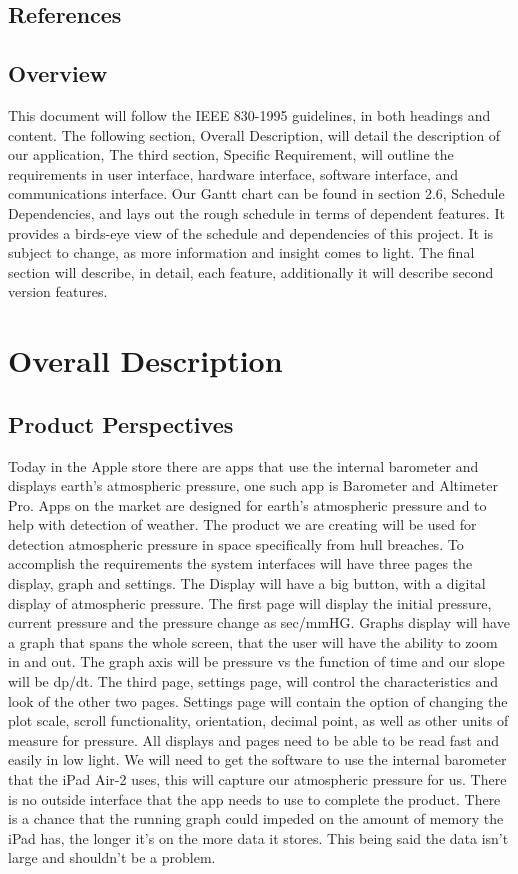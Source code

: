 \documentclass[onecolumn, draftclsnofoot,10pt, compsoc]{IEEEtran}
\begin{document}
\subsection{References}

\subsection{Overview}
This document will follow the IEEE 830-1995 guidelines, in both headings and content.
The following section, Overall Description, will detail the description of our application,
The third section, Specific Requirement, will outline the requirements in user interface, hardware interface, software interface, and communications interface.
Our Gantt chart can be found in section 2.6, Schedule Dependencies, and lays out the rough schedule in terms of dependent features.
It provides a birds-eye view of the schedule and dependencies of this project.
It is subject to change, as more information and insight comes to light.
The final section will describe, in detail, each feature, additionally it will describe second version features.

\section{Overall Description}

\subsection{Product Perspectives}
Today in the Apple store there are apps that use the internal barometer and displays earth's atmospheric pressure, one such app is Barometer and Altimeter Pro.
Apps on the market are designed for earth's atmospheric pressure and to help with detection of weather.
The product we are creating will be used for detection atmospheric pressure in space specifically from hull breaches.
To accomplish the requirements the system interfaces will have three pages the display, graph and settings.
The Display will have a big button, with a digital display of atmospheric pressure.
The first page will display the initial pressure, current pressure and the pressure change as sec/mmHG.
Graphs display will have a graph that spans the whole screen, that the user will have the ability to zoom in and out.
 The graph axis will be pressure vs the function of time and our slope will be dp/dt.
 The third page, settings page, will control the characteristics and look of the other two pages.
Settings page will contain the option of changing the plot scale, scroll functionality, orientation, decimal point, as well as other units of measure for pressure.
 All displays and pages need to be able to be read fast and easily in low light.
We will need to get the software to use the internal barometer that the iPad Air-2 uses, this will capture our atmospheric pressure for us.
There is no outside interface that the app needs to use to complete the product.
There is a chance that the running graph could impeded on the amount of memory the iPad has, the longer it's on the more data it stores.
This being said the data isn't large and shouldn't be a problem.
\end{document}
